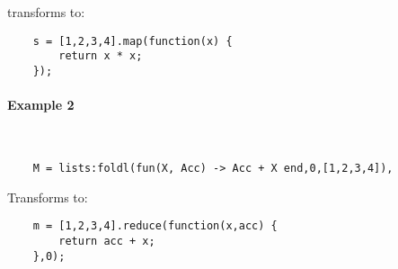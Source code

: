 transforms to:

\begin{lstlisting}
    s = [1,2,3,4].map(function(x) {
        return x * x;
    });
\end{lstlisting}

\paragraph{\bf Example 2}\ 

\vspace{1\baselineskip}
\begin{lstlisting}
    M = lists:foldl(fun(X, Acc) -> Acc + X end,0,[1,2,3,4]),
\end{lstlisting}

Transforms to:

\begin{lstlisting}
    m = [1,2,3,4].reduce(function(x,acc) {
        return acc + x;
    },0);
\end{lstlisting}
